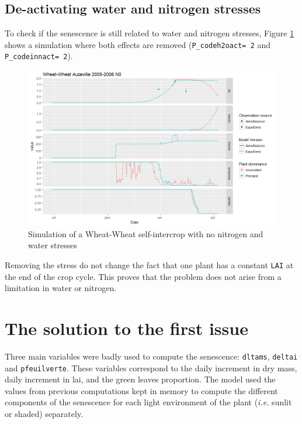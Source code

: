 \documentclass[
]{book}
\begin{document}
\hypertarget{de-activating-water-and-nitrogen-stresses}{%
\subsection{De-activating water and nitrogen stresses}\label{de-activating-water-and-nitrogen-stresses}}

To check if the senescence is still related to water and nitrogen stresses, Figure \ref{fig:nostress} shows a simulation where both effects are removed (\texttt{P\_codeh2oact=\ 2} and \texttt{P\_codeinnact=\ 2}).

\begin{figure}
\centering
\includegraphics{img/nostress.png}
\caption{\label{fig:nostress}Simulation of a Wheat-Wheat self-intercrop with no nitrogen and water stresses}
\end{figure}

Removing the stress do not change the fact that one plant has a constant \texttt{LAI} at the end of the crop cycle. This proves that the problem does not arise from a limitation in water or nitrogen.

\hypertarget{the-solution-to-the-first-issue}{%
\section{The solution to the first issue}\label{the-solution-to-the-first-issue}}

Three main variables were badly used to compute the senescence: \texttt{dltams}, \texttt{deltai} and \texttt{pfeuilverte}. These variables correspond to the daily increment in dry mass, daily increment in lai, and the green leaves proportion. The model used the values from previous computations kept in memory to compute the different components of the senescence for each light environment of the plant (\emph{i.e.} sunlit or shaded) separately.
\end{document}
